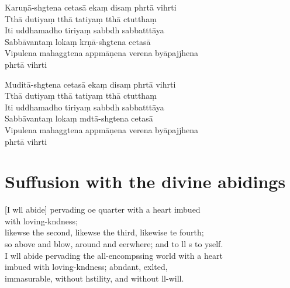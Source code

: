 Karuṇā-shgtena cetasā ekaṃ disaṃ phrtā vihrti\\
Tthā dutiyaṃ tthā tatiyaṃ tthā ctutthaṃ\\
Iti uddhamadho tiriyaṃ sabbdh sabbatttāya\\
Sabbāvantaṃ lokaṃ krṇā-shgtena cetasā\\
Vipulena mahaggtena appmāṇena verena byāpajjhena\\
\vin phrtā vihrti

Muditā-shgtena cetasā ekaṃ disaṃ phrtā vihrti\\
Tthā dutiyaṃ tthā tatiyaṃ tthā ctutthaṃ\\
Iti uddhamadho tiriyaṃ sabbdh sabbatttāya\\
Sabbāvantaṃ lokaṃ mdtā-shgtena cetasā\\
Vipulena mahaggtena appmāṇena verena byāpajjhena\\
\vin phrtā vihrti


\clearpage

\chapter[Divine abidings]{Suffusion with the divine abidings}%

\begin{leader}
\end{leader}

[I wll abide] pervading oe quarter with a heart imbued\\
\vin with loving-kndness;\\
likewse the second, likewse the third, likewise te fourth;\\
so above and blow, around and eerwhere; and to ll s to yself.\\
I wll abide pervading the all-encompssing world with a heart \\
imbued with loving-kndness; abndant, exlted,\\
\vin immasurable, without hstility, and without ll-will.

